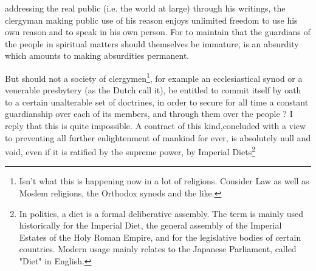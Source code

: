\documentclass[11pt,twocolumn]{ltugboat}
\begin{document}
addressing the real public (i.e. the world at large) through his writings, the clergyman making public use of his reason enjoys unlimited freedom to use his own reason and to speak in his own person. For to maintain that the guardians of the people in spiritual matters should themselves be immature, is an absurdity which amounts to making absurdities permanent.


But should not a society of clergymen\footnote{\protect\footnotesize Isn't what this is happening now in a lot of religions. Consider Law as well as Moslem religions, the Orthodox synods and the like.}, for example an ecclesiastical synod or a venerable presbytery (as the Dutch call it), be entitled to commit itself by oath to a certain unalterable set of doctrines, in order to secure for all time a constant guardianship over each of its members, and through them over the people ? I reply that this is quite impossible. A contract of this kind,concluded with a view to preventing all further enlightenment of mankind for ever, is absolutely null and void, even if it is ratified by the supreme power, by Imperial Diets\footnote{In politics, a diet is a formal deliberative assembly. The term is mainly used historically for the Imperial Diet, the general assembly of the Imperial Estates of the Holy Roman Empire, and for the legislative bodies of certain countries. Modern usage mainly relates to the Japanese Parliament, called "Diet" in English.}
\end{document}
